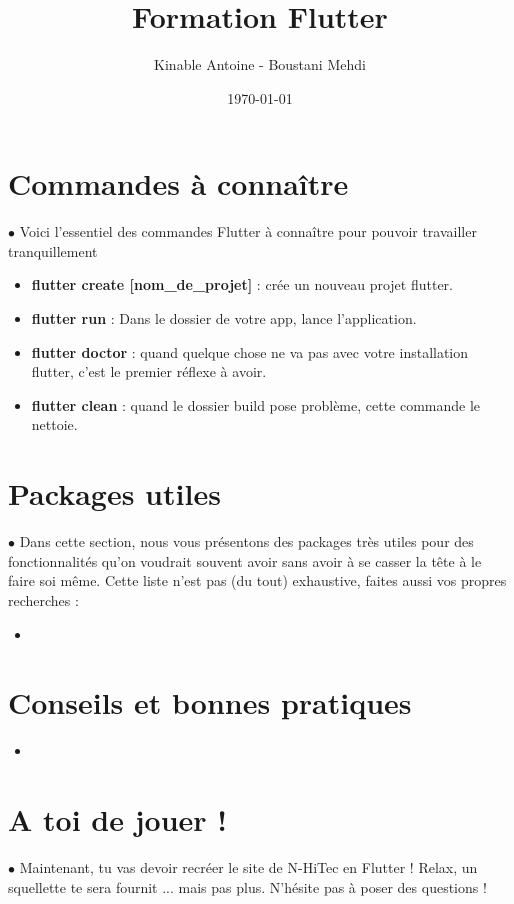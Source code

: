 \documentclass[internal]{nhitec_design}
\author{Kinable Antoine - Boustani Mehdi}
\date{\today}
\title{Formation Flutter}
\begin{document}
\maketitle
\newpage
{
  \hypersetup{linkcolor=black}
  \color{red_nhitec}
  \tableofcontents
}

\newpage


\newpage


\newpage


\newpage


\newpage
\section{Commandes à connaître}
\par $\bullet$ Voici l'essentiel des commandes Flutter à connaître  pour pouvoir travailler tranquillement
\begin{itemize}
  \item \textbf{flutter create [nom\_de\_projet]} : crée un nouveau projet flutter.
  \item \textbf{flutter run} : Dans le dossier de votre app, lance l'application.
  \item \textbf{flutter doctor} : quand quelque chose ne va pas avec votre installation flutter, c'est le premier réflexe à avoir.
  \item \textbf{flutter clean} : quand le dossier build pose problème, cette commande le nettoie.
\end{itemize}

\section{Packages utiles}
\par $\bullet$ Dans cette section, nous vous présentons des packages très utiles pour des fonctionnalités qu'on voudrait souvent avoir sans avoir à se casser la tête à le faire soi même. Cette liste n'est pas (du tout) exhaustive, faites aussi vos propres recherches :

\begin{itemize}
  \item
\end{itemize}

\newpage
\section{Conseils et bonnes pratiques}
\begin{itemize}
  \item
\end{itemize}

\newpage
\section{A toi de jouer !}
\par $\bullet$ Maintenant, tu vas devoir recréer le site de N-HiTec en Flutter ! Relax, un squellette te sera fournit ... mais pas plus. N'hésite pas à poser des questions !
\end{document}
